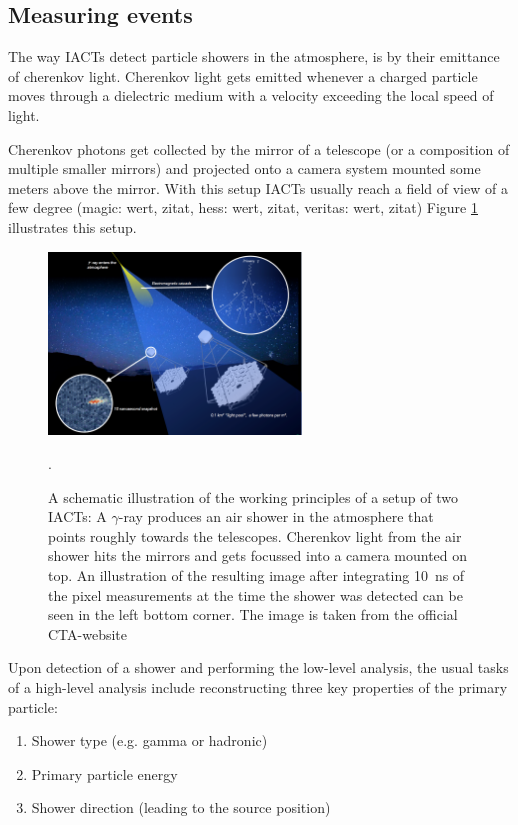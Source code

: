 \subsection{Measuring events}
The way IACTs detect particle showers in the atmosphere, is by their emittance 
of cherenkov light. Cherenkov light gets emitted whenever a 
charged particle moves through a dielectric medium with a velocity 
exceeding the local speed of light.

Cherenkov photons get collected by the mirror of a telescope (or a composition of 
multiple smaller mirrors) and projected onto a camera system mounted some 
meters above the mirror.
With this setup IACTs usually reach a field of view of 
a few degree (magic: wert, zitat, hess: wert, zitat, veritas: wert, zitat)
Figure \ref{fig:iact_mirror_camera} illustrates this 
setup.


\begin{figure}
	\centering
	\includegraphics[width=0.6\textwidth]{images/cta47.png}
	\caption{A schematic illustration of the working principles of 
	a setup of two IACTs:
	A $\gamma$-ray produces an air shower in the atmosphere
	that points roughly towards the telescopes.
	Cherenkov light from the air shower 
	hits the mirrors and gets focussed into a camera mounted on top.
	An illustration of the resulting image after integrating 
	\SI{10}{\nano\second} of the pixel measurements at the time the shower 
	was detected
	can be seen in the left bottom corner.
	The image is taken from the official CTA-website \cite{cta_web}}.
	\label{fig:iact_mirror_camera}
\end{figure}


Upon detection of a shower and performing the low-level analysis,
the usual tasks of a high-level analysis include reconstructing 
three key properties of the primary particle:
\begin{enumerate}
	\item{Shower type (e.g. gamma or hadronic)}
	\item{Primary particle energy}
	\item{Shower direction (leading to the source position)}
\end{enumerate}

